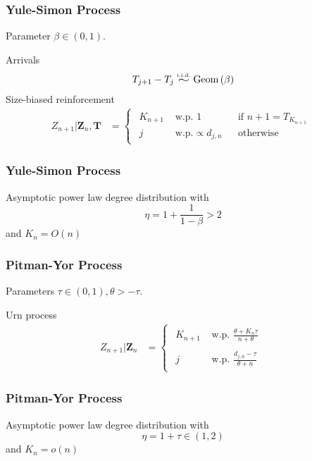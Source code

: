 \documentclass[final,hyperref={pdfpagelabels=false},noamsthm]{beamer}
\newcommand{\ee}{Z} %
\newcommand{\bfee}{\mathbf{\ee}}
\newcommand{\bfT}{\mathbf{T}}
\newcommand{\simiid}{\overset{\scriptscriptstyle{\text{i.i.d.}}}{\widesim}}
\newcommand{\widesim}[1][1.5]{
	\mathrel{\scalebox{#1}[1]{$\sim$}}
}
\begin{document}
\begin{frame}
	\frametitle{Yule-Simon Process}
	Parameter $\beta \in (0, 1)$.
	\vspace{15pt}
	
	Arrivals
	\begin{align*}
	T_{j+1} - T_{j} \simiid \text{Geom}\left( \beta \right)
	\end{align*}
	Size-biased reinforcement
	\begin{align*} 
	\ee_{n+1} | \bfee_{n}, \bfT &= \begin{cases}\begin{aligned}
	K_{n+1} & \text{ w.p. } 1 && \text{if } n+1 = T_{K_{n+1}} \\
	j &\text{ w.p.} \propto d_{j,n} && \text{otherwise} 
	\end{aligned}\end{cases}
	\label{eq:ys}
	\end{align*}
\end{frame}

\begin{frame}
	\frametitle{Yule-Simon Process}
	Asymptotic power law degree distribution with
	\begin{equation*}
		\eta = 1 + \frac{1}{1-\beta} > 2
	\end{equation*}
	and $K_n = O(n)$
\end{frame}

\begin{frame}
	\frametitle{Pitman-Yor Process}
	Parameters $\tau \in (0, 1), \theta > -\tau$.
	\vspace{15pt}
	
	Urn process
	\begin{align*} 
	\ee_{n+1} | \bfee_{n} &= \begin{cases}\begin{aligned}
	K_{n+1} & \text{ w.p. } \frac{\theta + K_n \tau}{n + \theta}  \\
	& \\
	j &\text{ w.p. } \frac{d_{j,n} - \tau}{\theta + n} 
	\end{aligned}\end{cases}
	\label{eq:pyp2}
	\end{align*}
\end{frame}

\begin{frame}
	\frametitle{Pitman-Yor Process}
	Asymptotic power law degree distribution with
	\begin{equation*}
		\eta = 1 + \tau \in (1, 2)
	\end{equation*}
	and $K_n = o(n)$
\end{frame}
\end{document}
